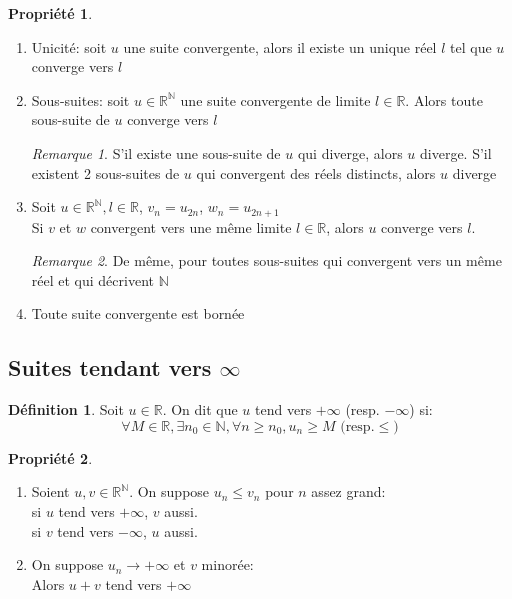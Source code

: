 \documentclass[fleqn]{article}
\theoremstyle{definition} \newtheorem*{defi}{D\'efinition}
\theoremstyle{definition} \newtheorem*{theo}{Th\'eor\`eme}
\theoremstyle{definition} \newtheorem*{prop}{Propri\'et\'e}
\theoremstyle{definition} \newtheorem*{coro}{Corollaire}
\theoremstyle{remark} \newtheorem*{rqs}{Remarque}
\begin{document}
\begin{prop} $ $
	\begin{enumerate}
		\item Unicit\'e: soit $u$ une suite convergente, alors il existe un unique r\'eel $l$ tel que $u$ converge vers $l$
		\item Sous-suites: soit $u \in \mathbb{R}^\mathbb{N}$ une suite convergente de limite $l \in \mathbb{R}$. Alors toute sous-suite
			de $u$ converge vers $l$
			\begin{rqs}
				S'il existe une sous-suite de $u$ qui diverge, alors $u$ diverge. S'il existent 2 sous-suites de $u$ qui convergent des
				r\'eels distincts, alors $u$ diverge
			\end{rqs}
		\item Soit $u \in \mathbb{R}^\mathbb{N}, l \in \mathbb{R}$, $v_n = u_{2n}$, $w_n = u_{2n+1}$ \\
			Si $v$ et $w$ convergent vers une m\^eme limite $l \in \mathbb{R}$, alors $u$ converge vers $l$.
			\begin{rqs}
				De m\^eme, pour toutes sous-suites qui convergent vers un m\^eme r\'eel et qui d\'ecrivent $\mathbb{N}$
			\end{rqs}
		\item Toute suite convergente  est born\'ee
	\end{enumerate}
\end{prop}

\subsection{Suites tendant vers $\infty$}
\begin{defi}
	Soit $u \in \mathbb{R}$. On dit que $u$ tend vers $+\infty$ (resp. $-\infty$) si:
	\[\forall M \in \mathbb{R}, \exists n_0 \in \mathbb{N}, \forall n \geq n_0, u_n \geq M \text{ (resp.} \leq)\]
\end{defi}
\begin{prop} $ $
	\begin{enumerate}
		\item Soient $u, v \in \mathbb{R}^\mathbb{N}$. On suppose $u_n \leq v_n$ pour $n$ assez grand: \\
			si $u$ tend vers $+\infty$, $v$ aussi. \\
			si $v$ tend vers $-\infty$, $u$ aussi.
		\item On suppose $u_n \rightarrow +\infty$ et $v$ minor\'ee: \\
			Alors $u+v$ tend vers $+\infty$
	\end{enumerate}
\end{prop}
\end{document}
